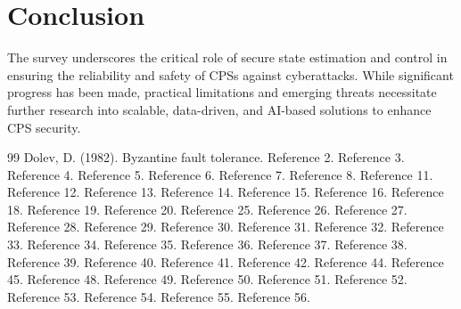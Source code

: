 \documentclass{article}
\begin{document}
\section*{Conclusion}
The survey underscores the critical role of secure state estimation and control in ensuring the reliability and safety of CPSs against cyberattacks. While significant progress has been made, practical limitations and emerging threats necessitate further research into scalable, data-driven, and AI-based solutions to enhance CPS security.


\begin{thebibliography}{99}
 Dolev, D. (1982). Byzantine fault tolerance.
 Reference 2.
 Reference 3.
 Reference 4.
 Reference 5.
 Reference 6.
 Reference 7.
 Reference 8.
 Reference 11.
 Reference 12.
 Reference 13.
 Reference 14.
 Reference 15.
 Reference 16.
 Reference 18.
 Reference 19.
 Reference 20.
 Reference 25.
 Reference 26.
 Reference 27.
 Reference 28.
 Reference 29.
 Reference 30.
 Reference 31.
 Reference 32.
 Reference 33.
 Reference 34.
 Reference 35.
 Reference 36.
 Reference 37.
 Reference 38.
 Reference 39.
 Reference 40.
 Reference 41.
 Reference 42.
 Reference 44.
 Reference 45.
 Reference 48.
 Reference 49.
 Reference 50.
 Reference 51.
 Reference 52.
 Reference 53.
 Reference 54.
 Reference 55.
 Reference 56.
\end{thebibliography}
\end{document}
